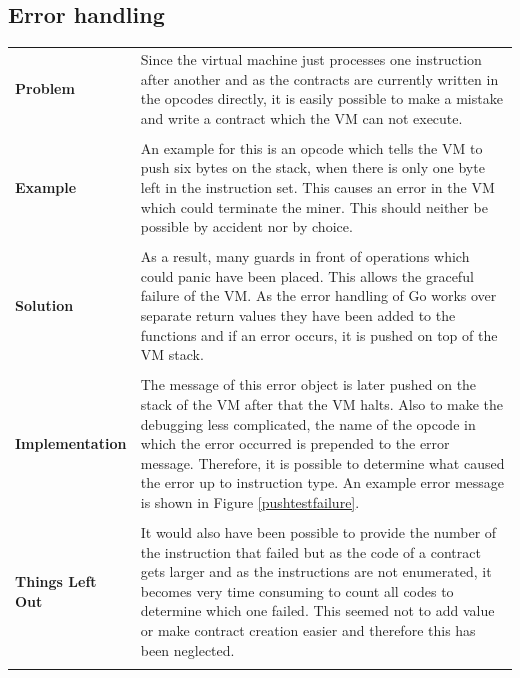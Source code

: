 \subsection{Error handling}
\begin{tabular}[t]{ p{3cm} p{12.5cm}}
\raggedright
\textbf{Problem} &
Since the virtual machine just processes one instruction after another and as the contracts are currently written in the opcodes directly, it is easily possible to make a mistake and write a contract which the VM can not execute. \\ \\

\raggedright
\textbf{Example} &
An example for this is an opcode which tells the VM to push six bytes on the stack, when there is only one byte left in the instruction set. This causes an error in the VM which could terminate the miner. This should neither be possible by accident nor by choice. \\ \\

\raggedright
\textbf{Solution} &
As a result, many guards in front of operations which could panic have been placed. This allows the graceful failure of the VM. As the error handling of Go works over separate return values they have been added to the functions and if an error occurs, it is pushed on top of the VM stack. \\ \\

\raggedright
\textbf{Implementation} &
The message of this error object is later pushed on the stack of the VM after that the VM halts. Also to make the debugging less complicated, the name of the opcode in which the error occurred is prepended to the error message. Therefore, it is possible to determine what caused the error up to instruction type. An example error message is shown in Figure \ref{pushtestfailure}. \\ \\

\raggedright
\textbf{Things Left Out} &
It would also have been possible to provide the number of the instruction that failed but as the code of a contract gets larger and as the instructions are not enumerated, it becomes very time consuming to count all codes to determine which one failed. This seemed not to add value or make contract creation easier and therefore this has been neglected. \\ \\
\end{tabular}


